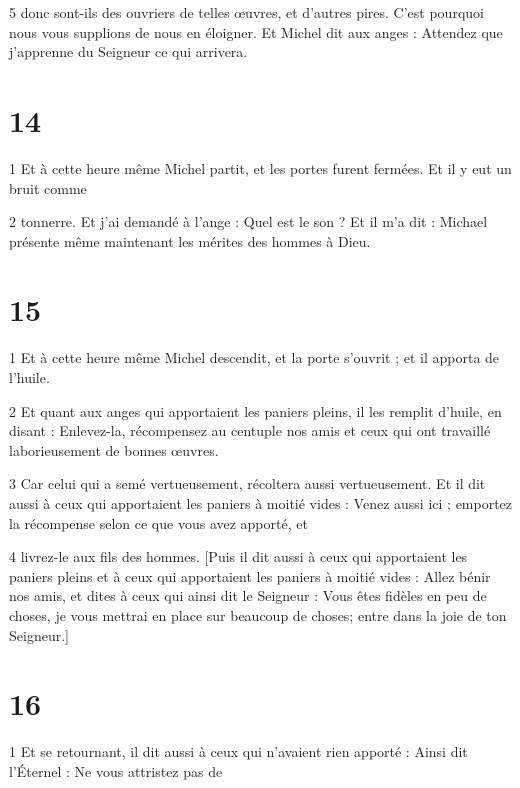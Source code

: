 \par 5 donc sont-ils des ouvriers de telles œuvres, et d'autres pires. C'est pourquoi nous vous supplions de nous en éloigner. Et Michel dit aux anges : Attendez que j'apprenne du Seigneur ce qui arrivera.

\chapter{14}

\par 1 Et à cette heure même Michel partit, et les portes furent fermées. Et il y eut un bruit comme

\par 2 tonnerre. Et j'ai demandé à l'ange : Quel est le son ? Et il m'a dit : Michael présente même maintenant les mérites des hommes à Dieu.

\chapter{15}

\par 1 Et à cette heure même Michel descendit, et la porte s'ouvrit ; et il apporta de l'huile.

\par 2 Et quant aux anges qui apportaient les paniers pleins, il les remplit d'huile, en disant : Enlevez-la, récompensez au centuple nos amis et ceux qui ont travaillé laborieusement de bonnes œuvres.

\par 3 Car celui qui a semé vertueusement, récoltera aussi vertueusement. Et il dit aussi à ceux qui apportaient les paniers à moitié vides : Venez aussi ici ; emportez la récompense selon ce que vous avez apporté, et

\par 4 livrez-le aux fils des hommes. [Puis il dit aussi à ceux qui apportaient les paniers pleins et à ceux qui apportaient les paniers à moitié vides : Allez bénir nos amis, et dites à ceux qui ainsi dit le Seigneur : Vous êtes fidèles en peu de choses, je vous mettrai en place sur beaucoup de choses; entre dans la joie de ton Seigneur.]

\chapter{16}

\par 1 Et se retournant, il dit aussi à ceux qui n'avaient rien apporté : Ainsi dit l'Éternel : Ne vous attristez pas de

